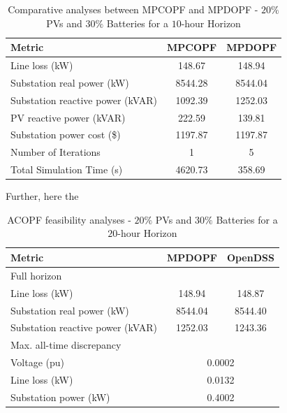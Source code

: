 \documentclass[../../outputs/main.tex]{subfiles}
\begin{document}
\begin{table}[h!]
    \centering
    \caption{Comparative analyses between MPCOPF and MPDOPF - $20 \%$ PVs and $30 \%$ Batteries for a $10$-hour Horizon}
    \begin{tabular}{|l|c|c|}
    \hline
    \textbf{Metric} & \textbf{MPCOPF} & \textbf{MPDOPF} \\ \hline
    Line loss (kW) & 148.67 & 148.94 \\ \hline
    Substation real power (kW) & 8544.28 & 8544.04 \\ \hline
    Substation reactive power (kVAR) & 1092.39 & 1252.03 \\ \hline
    PV reactive power (kVAR) & 222.59 & 139.81 \\ \hline
    Substation power cost (\$) & 1197.87 & 1197.87 \\ \hline
    Number of Iterations & 1 & 5 \\ \hline
    Total Simulation Time (s) & 4620.73 & 358.69 \\ \hline
    \end{tabular}
    \label{table:opt-10-20-30}
\end{table}



Further, here the 

\begin{table}[h!]
    \centering
    \caption{ACOPF feasibility analyses - $20 \%$ PVs and $30 \%$ Batteries for a $20$-hour Horizon}
    \begin{tabular}{|l|c|c|}
    \hline
    \textbf{Metric} & \textbf{MPDOPF} & \textbf{OpenDSS} \\ \hline
    Full horizon  & \multicolumn{2}{c|}{} \\ \hline
    \quad Line loss (kW) & 148.94 & 148.87 \\ \hline
    \quad Substation real power (kW) & 8544.04 & 8544.40 \\ \hline
    \quad Substation reactive power (kVAR) & 1252.03 & 1243.36 \\ \hline
    Max. all-time discrepancy & \multicolumn{2}{c|}{} \\ \hline
    \quad Voltage (pu) & \multicolumn{2}{c|}{0.0002} \\ \hline
    \quad Line loss (kW) & \multicolumn{2}{c|}{0.0132} \\ \hline
    \quad Substation power (kW) & \multicolumn{2}{c|}{0.4002} \\ \hline
    \end{tabular}
    \label{table:feas-copf-10-20-30}
\end{table}
\end{document}
